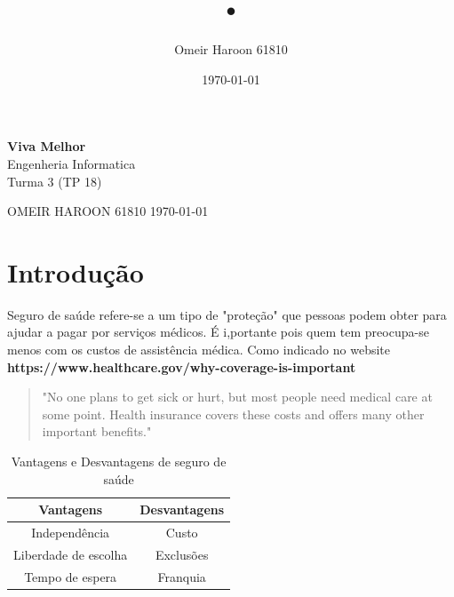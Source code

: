 \documentclass[10pt,a4paper]{article}
\title{•}
\author{Omeir Haroon 61810}
\date{\today}
\begin{document}
\begin{titlepage}
	\begin{center}
	{\Huge\bfseries Viva Melhor}\\
	\vspace{1cm}
	{\Large Engenheria Informatica}\\
	\vspace{1cm}
	{\Large Turma 3 (TP 18)}\\
	\end{center}
	\begin{flushright}
	{\Large OMEIR HAROON \Large 61810 \hfill  \large\today}
	\end{flushright}
	\begin{figure}[h]
	\begin{center}
	\end{center}
	\end{figure}
	
\end{titlepage}

\pagestyle{plain}

\section{Introdução}
	Seguro de saúde refere-se a um tipo de "proteção"
que pessoas podem obter para ajudar a pagar por serviços médicos. É i,portante pois quem tem preocupa-se menos com os custos de assistência médica.
Como indicado no website {\bfseries https://www.healthcare.gov/why-coverage-is-important}
\begin{quotation}
"No one plans to get sick or hurt, but most people need medical care at some point. Health insurance covers these costs and offers many other important benefits."
\end{quotation}
\begin{table}
	\centering
	\caption{Vantagens e Desvantagens de seguro de saúde}
	\begin{tabular}{|c|c|}
	\hline
	{\bfseries Vantagens} & {\bfseries Desvantagens}\\
	\hline
	Independência &  Custo\\
	\hline	
	Liberdade de escolha & Exclusões\\
	\hline	
	Tempo de espera  & Franquia\\
	\hline
	
	
	\end{tabular}
\end{table}
\end{document}
